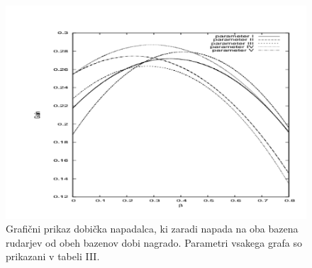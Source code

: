 \documentclass{acm_proc_article-sp}
\begin{document}
\begin{figure}
  \includegraphics[scale=0.5]{image7_2.png}
  \caption{Grafični prikaz dobička napadalca, ki zaradi napada na oba bazena rudarjev od obeh bazenov dobi nagrado. Parametri vsakega grafa so prikazani v tabeli III.}
  \label{fig:boat1}
\end{figure}
\end{document}
